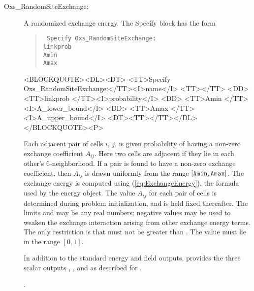 \begin{description}
%
\item[Oxs\_RandomSiteExchange:]
   A randomized exchange energy.  The Specify block has the form
   \begin{latexonly}
      \begin{quote}\tt
      Specify Oxs\_RandomSiteExchange: \ocb\\
        \bi linkprob  \\
        \bi Amin  \\
        \bi Amax  \\
      \ccb
      \end{quote}
   \end{latexonly}
   \begin{rawhtml}
   <BLOCKQUOTE><DL><DT>
   <TT>Specify Oxs_RandomSiteExchange:</TT><I>name</I> <TT>{</TT>
       <DD> <TT>linkprob </TT><I>probability</I>
       <DD> <TT>Amin </TT><I>A_lower_bound</I>
       <DD> <TT>Amax </TT><I>A_upper_bound</I>
   <DT><TT>}</TT></DL></BLOCKQUOTE><P>
   \end{rawhtml}
   Each adjacent pair of cells $i$, $j$, is given 
   probability of having a non-zero exchange coefficient $A_{ij}$.  Here
   two cells are adjacent if they lie in each other's 6-neighborhood.
   If a pair is found to have a non-zero exchange coefficient, then
   $A_{ij}$ is drawn uniformly from the range $[\texttt{Amin},\texttt{Amax}]$.
   The exchange energy is computed using (\ref{eq:ExchangeEnergy}), the
   formula used by the  energy object.  The
   value $A_{ij}$ for each pair of cells is determined during problem
   initialization, and is held fixed thereafter.  The limits
    and  may be any real
   numbers; negative values may be used to weaken the exchange
   interaction arising from other exchange energy terms.  The only
   restriction is that  must not be greater than
   .  The  value 
   must lie in the range $[0,1]$.

   In addition to the standard energy and field outputs,
    provides the three scalar outputs
   , , and
    as described for .

   \begin{ExampleMifs}[Example]
     .
   \end{ExampleMifs}

\end{description}

